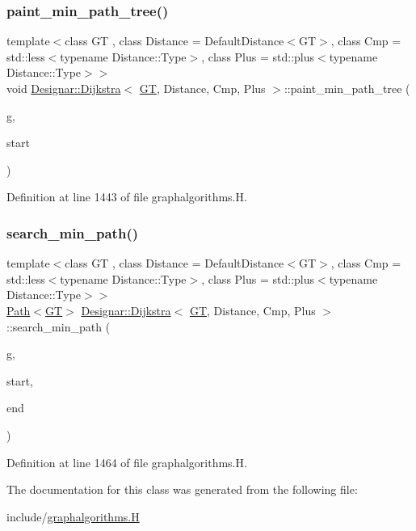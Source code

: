 \subsubsection{\texorpdfstring{paint\+\_\+min\+\_\+path\+\_\+tree()}{paint\_min\_path\_tree()}}
{\footnotesize\ttfamily template$<$class GT , class Distance  = Default\+Distance$<$\+G\+T$>$, class Cmp  = std\+::less$<$typename Distance\+::\+Type$>$, class Plus  = std\+::plus$<$typename Distance\+::\+Type$>$$>$ \\
void \hyperlink{class_designar_1_1_dijkstra}{Designar\+::\+Dijkstra}$<$ \hyperlink{demo-buildgraph_8_c_a3001c40d2c31ca87ed96cd7d1334a55e}{GT}, Distance, Cmp, Plus $>$\+::paint\+\_\+min\+\_\+path\+\_\+tree (\begin{DoxyParamCaption}\item[{\hyperlink{demo-buildgraph_8_c_a3001c40d2c31ca87ed96cd7d1334a55e}{GT} \&}]{g,  }\item[{\hyperlink{class_designar_1_1_dijkstra_afeb644fc5395569ec366f0d220ab477d}{Node} \&}]{start }\end{DoxyParamCaption})\hspace{0.3cm}{\ttfamily [inline]}}



Definition at line 1443 of file graphalgorithms.\+H.

\mbox{\label{class_designar_1_1_dijkstra_ab2d75c571dff03279bea0192047461f0}} 
\subsubsection{\texorpdfstring{search\+\_\+min\+\_\+path()}{search\_min\_path()}}
{\footnotesize\ttfamily template$<$class GT , class Distance  = Default\+Distance$<$\+G\+T$>$, class Cmp  = std\+::less$<$typename Distance\+::\+Type$>$, class Plus  = std\+::plus$<$typename Distance\+::\+Type$>$$>$ \\
\hyperlink{class_designar_1_1_path}{Path}$<$\hyperlink{demo-buildgraph_8_c_a3001c40d2c31ca87ed96cd7d1334a55e}{GT}$>$ \hyperlink{class_designar_1_1_dijkstra}{Designar\+::\+Dijkstra}$<$ \hyperlink{demo-buildgraph_8_c_a3001c40d2c31ca87ed96cd7d1334a55e}{GT}, Distance, Cmp, Plus $>$\+::search\+\_\+min\+\_\+path (\begin{DoxyParamCaption}\item[{\hyperlink{demo-buildgraph_8_c_a3001c40d2c31ca87ed96cd7d1334a55e}{GT} \&}]{g,  }\item[{\hyperlink{class_designar_1_1_dijkstra_afeb644fc5395569ec366f0d220ab477d}{Node} \&}]{start,  }\item[{\hyperlink{class_designar_1_1_dijkstra_afeb644fc5395569ec366f0d220ab477d}{Node} \&}]{end }\end{DoxyParamCaption})\hspace{0.3cm}{\ttfamily [inline]}}



Definition at line 1464 of file graphalgorithms.\+H.



The documentation for this class was generated from the following file\+:\begin{DoxyCompactItemize}
\item 
include/\hyperlink{graphalgorithms_8_h}{graphalgorithms.\+H}\end{DoxyCompactItemize}
